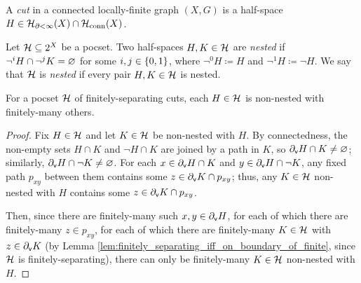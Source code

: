 \documentclass[reqno]{amsart}
\begin{document}
    \begin{definition}
        A \textit{cut} in a connected locally-finite graph $(X,G)$ is a half-space $H\in\mc{H}_{\del<\infty}(X)\cap\mc{H}_\mathrm{conn}(X)$.
    \end{definition}

    \begin{definition}\label{def:nested}
        Let $\mc{H}\subseteq2^X$ be a pocset. Two half-spaces $H,K\in\mc{H}$ are \textit{nested} if $\lnot^iH\cap\lnot^jK=\em$ for some $i,j\in\l\{0,1\r\}$, where $\lnot^0H\coloneqq H$ and $\lnot^1H\coloneqq\lnot H$. We say that $\mc{H}$ is \textit{nested} if every pair $H,K\in\mc{H}$ is nested.
    \end{definition}

    \begin{lemma}\label{lem:connected_cuts_non_nested_finitely_others}
        For a pocset $\mc{H}$ of finitely-separating cuts, each $H\in\mc{H}$ is non-nested with finitely-many others.
    \end{lemma}
    \begin{proof}
        Fix $H\in\mc{H}$ and let $K\in\mc{H}$ be non-nested with $H$. By connectedness, the non-empty sets $H\cap K$ and $\lnot H\cap K$ are joined by a path in $K$, so $\del_\mathsf{v}H\cap K\neq\em$; similarly, $\del_\mathsf{v}H\cap\lnot K\neq\em$. For each $x\in\del_\mathsf{v}H\cap K$ and $y\in\del_\mathsf{v}H\cap\lnot K$, any fixed path $p_{xy}$ between them contains some $z\in\del_\mathsf{v}K\cap p_{xy}$; thus, any $K\in\mc{H}$ non-nested with $H$ contains some $z\in\del_\mathsf{v}K\cap p_{xy}$.

        Then, since there are finitely-many such $x,y\in\del_\mathsf{v}H$, for each of which there are finitely-many $z\in p_{xy}$, for each of which there are finitely-many $K\in\mc{H}$ with $z\in\del_\mathsf{v}K$ (by Lemma \ref{lem:finitely_separating_iff_on_boundary_of_finite}, since $\mc{H}$ is finitely-separating), there can only be finitely-many $K\in\mc{H}$ non-nested with $H$.
    \end{proof}

\end{document}
